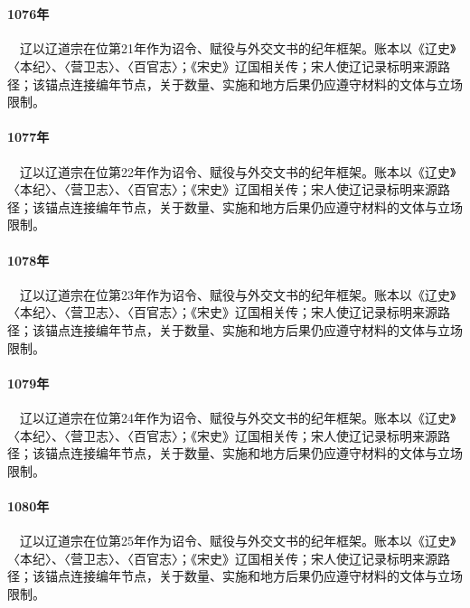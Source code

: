 \section{}

\paragraph{1076年}　辽以辽道宗在位第21年作为诏令、赋役与外交文书的纪年框架。账本以《辽史》〈本纪〉、〈营卫志〉、〈百官志〉；《宋史》辽国相关传；宋人使辽记录标明来源路径；该锚点连接编年节点，关于数量、实施和地方后果仍应遵守材料的文体与立场限制。

\paragraph{1077年}　辽以辽道宗在位第22年作为诏令、赋役与外交文书的纪年框架。账本以《辽史》〈本纪〉、〈营卫志〉、〈百官志〉；《宋史》辽国相关传；宋人使辽记录标明来源路径；该锚点连接编年节点，关于数量、实施和地方后果仍应遵守材料的文体与立场限制。

\paragraph{1078年}　辽以辽道宗在位第23年作为诏令、赋役与外交文书的纪年框架。账本以《辽史》〈本纪〉、〈营卫志〉、〈百官志〉；《宋史》辽国相关传；宋人使辽记录标明来源路径；该锚点连接编年节点，关于数量、实施和地方后果仍应遵守材料的文体与立场限制。

\paragraph{1079年}　辽以辽道宗在位第24年作为诏令、赋役与外交文书的纪年框架。账本以《辽史》〈本纪〉、〈营卫志〉、〈百官志〉；《宋史》辽国相关传；宋人使辽记录标明来源路径；该锚点连接编年节点，关于数量、实施和地方后果仍应遵守材料的文体与立场限制。

\paragraph{1080年}　辽以辽道宗在位第25年作为诏令、赋役与外交文书的纪年框架。账本以《辽史》〈本纪〉、〈营卫志〉、〈百官志〉；《宋史》辽国相关传；宋人使辽记录标明来源路径；该锚点连接编年节点，关于数量、实施和地方后果仍应遵守材料的文体与立场限制。

